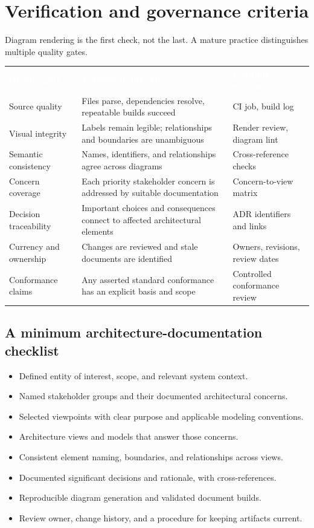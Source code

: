 \documentclass[11pt,letterpaper,oneside]{article}
\newcommand{\thead}[1]{\textcolor{white}{\bfseries #1}}
\begin{document}
\section{Verification and governance criteria}\label{sec:governance}
Diagram rendering is the first check, not the last. A mature practice distinguishes multiple quality gates.
\small
{}
\begin{tabularx}{\textwidth}{@{}L{0.23\textwidth}Y L{0.25\textwidth}@{}}
\thead{Quality gate} & \thead{Validation objective} & \thead{Example evidence}\\
Source quality & Files parse, dependencies resolve, repeatable builds succeed & CI job, build log\\
Visual integrity & Labels remain legible; relationships and boundaries are unambiguous & Render review, diagram lint\\
Semantic consistency & Names, identifiers, and relationships agree across diagrams & Cross-reference checks\\
Concern coverage & Each priority stakeholder concern is addressed by suitable documentation & Concern-to-view matrix\\
Decision traceability & Important choices and consequences connect to affected architectural elements & ADR identifiers and links\\
Currency and ownership & Changes are reviewed and stale documents are identified & Owners, revisions, review dates\\
Conformance claims & Any asserted standard conformance has an explicit basis and scope & Controlled conformance review\\
\end{tabularx}
\normalsize

\subsection{A minimum architecture-documentation checklist}
\begin{itemize}[label=$\square$]
\item Defined entity of interest, scope, and relevant system context.
\item Named stakeholder groups and their documented architectural concerns.
\item Selected viewpoints with clear purpose and applicable modeling conventions.
\item Architecture views and models that answer those concerns.
\item Consistent element naming, boundaries, and relationships across views.
\item Documented significant decisions and rationale, with cross-references.
\item Reproducible diagram generation and validated document builds.
\item Review owner, change history, and a procedure for keeping artifacts current.
\end{itemize}
\end{document}
